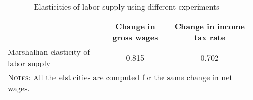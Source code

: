\begin{table}[htbp]\caption{Elasticities of labor supply using different experiments}\label{table:elasticities}\centering\footnotesize\begin{tabular}{lcc} \toprule & Change in gross wages & Change in income tax rate   \\\midrule    Marshallian elasticity of labor supply &0.815&0.702\\  \bottomrule\multicolumn{3}{l}{\textsc{Notes:} All the elsticities are computed for the same change in net wages.}\end{tabular}
      \end{table}